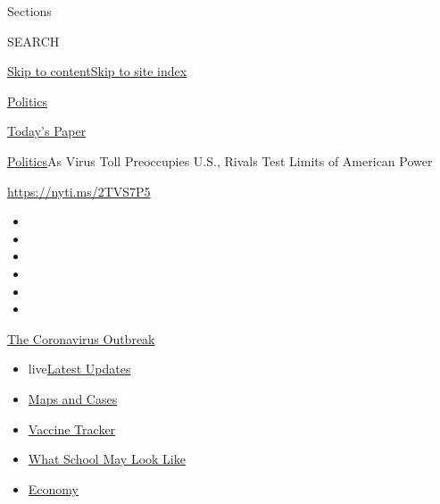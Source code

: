 Sections

SEARCH

\protect\hyperlink{site-content}{Skip to
content}\protect\hyperlink{site-index}{Skip to site index}

\href{https://www.nytimes.com/section/politics}{Politics}

\href{https://myaccount.nytimes.com/auth/login?response_type=cookie\&client_id=vi}{}

\href{https://www.nytimes.com/section/todayspaper}{Today's Paper}

\href{/section/politics}{Politics}\textbar{}As Virus Toll Preoccupies
U.S., Rivals Test Limits of American Power

\url{https://nyti.ms/2TVS7P5}

\begin{itemize}
\item
\item
\item
\item
\item
\item
\end{itemize}

\href{https://www.nytimes.com/news-event/coronavirus?action=click\&pgtype=Article\&state=default\&region=TOP_BANNER\&context=storylines_menu}{The
Coronavirus Outbreak}

\begin{itemize}
\tightlist
\item
  live\href{https://www.nytimes.com/2020/08/01/world/coronavirus-covid-19.html?action=click\&pgtype=Article\&state=default\&region=TOP_BANNER\&context=storylines_menu}{Latest
  Updates}
\item
  \href{https://www.nytimes.com/interactive/2020/us/coronavirus-us-cases.html?action=click\&pgtype=Article\&state=default\&region=TOP_BANNER\&context=storylines_menu}{Maps
  and Cases}
\item
  \href{https://www.nytimes.com/interactive/2020/science/coronavirus-vaccine-tracker.html?action=click\&pgtype=Article\&state=default\&region=TOP_BANNER\&context=storylines_menu}{Vaccine
  Tracker}
\item
  \href{https://www.nytimes.com/interactive/2020/07/29/us/schools-reopening-coronavirus.html?action=click\&pgtype=Article\&state=default\&region=TOP_BANNER\&context=storylines_menu}{What
  School May Look Like}
\item
  \href{https://www.nytimes.com/live/2020/07/31/business/stock-market-today-coronavirus?action=click\&pgtype=Article\&state=default\&region=TOP_BANNER\&context=storylines_menu}{Economy}
\end{itemize}

